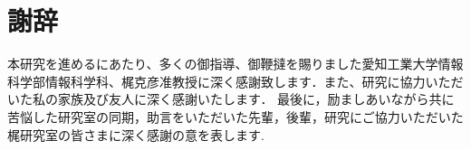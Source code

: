 \chapter*{謝辞}
本研究を進めるにあたり、多くの御指導、御鞭撻を賜りました愛知工業大学情報科学部情報科学科、梶克彦准教授に深く感謝致します．また、研究に協力いただいた私の家族及び友人に深く感謝いたします．
最後に，励ましあいながら共に苦悩した研究室の同期，助言をいただいた先輩，後輩，研究にご協力いただいた梶研究室の皆さまに深く感謝の意を表します.